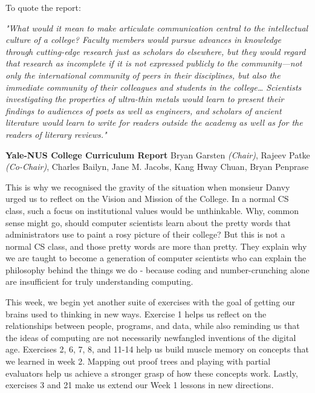 \documentclass{article}
\begin{document}
To quote the report:
\begin{quoting}
\textit{"What would it mean to make articulate communication central to the intellectual
culture of a college? Faculty members would pursue advances in knowledge through
cutting-edge research just as scholars do elsewhere, but they would regard that
research as incomplete if it is not expressed publicly to the community—not only the
international community of peers in their disciplines, but also the immediate community of their colleagues and students in the college… Scientists investigating the properties
of ultra-thin metals would learn to present their findings to audiences of poets as well
as engineers, and scholars of ancient literature would learn to write for readers outside
the academy as well as for the readers of literary reviews."}
\linebreak

\textbf{Yale-NUS College Curriculum Report} \linebreak Bryan Garsten \textit{(Chair)}, Rajeev Patke \textit{(Co-Chair)}, Charles Bailyn, Jane M. Jacobs, Kang Hway Chuan, Bryan Penprase
\end{quoting}
\linebreak
\linebreak \linebreak
This is why we recognised the gravity of the situation when monsieur Danvy urged us to reflect on the Vision and Mission of the College. In a normal CS class, such a focus on institutional values would be unthinkable. Why, common sense might go, should computer scientists learn about the pretty words that administrators use to paint a rosy picture of their college? But this is not a normal CS class, and those pretty words are more than pretty. They explain why we are taught to become a generation of computer scientists who can explain the philosophy behind the things we do - because coding and number-crunching alone are insufficient for truly understanding computing.
\linebreak

This week, we begin yet another suite of exercises with the goal of getting our brains used to thinking in new ways. Exercise 1 helps us reflect on the relationships between people, programs, and data, while also reminding us that the ideas of computing are not necessarily newfangled inventions of the digital age. Exercises 2, 6, 7, 8, and 11-14 help us build muscle memory on concepts that we learned in week 2. Mapping out proof trees and playing with partial evaluators help us achieve a stronger grasp of how these concepts work. Lastly, exercises 3 and 21 make us extend our Week 1 lessons in new directions.
\linebreak
\end{document}
